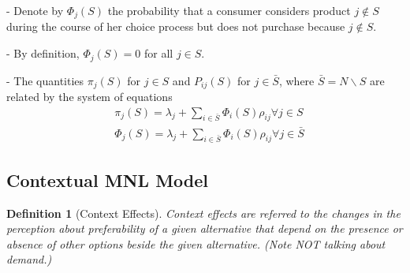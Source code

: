 \documentclass[11pt,a4paper]{article}
\newtheorem{definition}{Definition}
\begin{document}
- Denote by $\Phi_{j}(S)$ the probability that a consumer considers product $j \notin S$ during the course of her choice process but does not purchase because $j \notin S$.

- By definition, $\Phi_{j}(S)=0$ for all $j \in S$.

- The quantities $\pi_{j}(S)$ for $j \in S$ and $P_{i j}(S)$ for $j \in \bar{S}$, where $\bar{S}=N \backslash S$ are related by the system of equations
$$
\begin{aligned}
&\pi_{j}(S)=\lambda_{j}+\sum_{i \in \bar{S}} \Phi_{i}(S) \rho_{i j} \forall j \in S \\
&\Phi_{j}(S)=\lambda_{j}+\sum_{i \in \bar{S}} \Phi_{i}(S) \rho_{i j} \forall j \in \bar{S}
\end{aligned}
$$

\subsection{Contextual MNL Model}
\begin{definition}[Context Effects]
    Context effects are referred to the changes in the perception about preferability of a given alternative that depend on the presence or absence of other options beside the given alternative. (Note NOT talking about demand.)
\end{definition}
\end{document}
